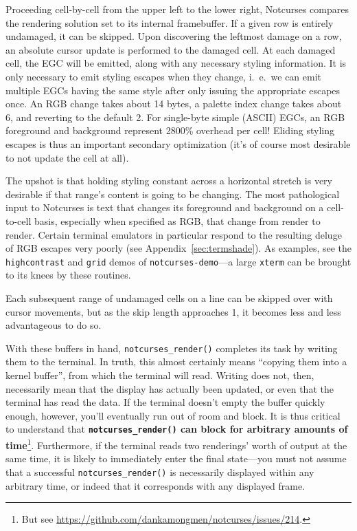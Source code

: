 \documentclass[letterpaper,10pt]{article}
\begin{document}
Proceeding cell-by-cell from the upper left to the lower right, Notcurses
compares the rendering solution set to its internal framebuffer. If a given row
is entirely undamaged, it can be skipped. Upon discovering the leftmost damage
on a row, an absolute cursor update is performed to the damaged cell. At each
damaged cell, the EGC will be emitted, along with any necessary styling
information. It is only necessary to emit styling escapes when they change, i.\ e.\ we
can emit multiple EGCs having the same style after only issuing the appropriate
escapes once. An RGB change takes about 14 bytes, a palette index change
takes about 6, and reverting to the default 2. For single-byte simple (ASCII)
EGCs, an RGB foreground and background represent 2800\% overhead per cell!
Eliding styling escapes is thus an important secondary optimization (it's of
course most desirable to not update the cell at all).

The upshot is that holding styling constant across a horizontal stretch is
very desirable if that range's content is going to be changing. The most
pathological input to Notcurses is text that changes its foreground and background
on a cell-to-cell basis, especially when specified as RGB, that change from
render to render. Certain terminal emulators in particular respond to the
resulting deluge of RGB escapes very poorly (see Appendix~\ref{sec:termshade}).
As examples, see the \texttt{highcontrast} and \texttt{grid} demos of
\texttt{notcurses-demo}---a large \texttt{xterm} can be brought to its knees
by these routines.

Each subsequent range of undamaged cells on a line can be skipped over with
cursor movements, but as the skip length approaches 1, it becomes less and
less advantageous to do so.

With these buffers in hand, \texttt{notcurses\_render()} completes its task by
writing them to the terminal. In truth, this almost certainly means ``copying
them into a kernel buffer'', from which the terminal will read. Writing does not,
then, necessarily mean that the display has actually been updated, or even
that the terminal has read the data. If the terminal doesn't empty the buffer
quickly enough, however, you'll eventually run out of room and block. It is
thus critical to understand that \textbf{\texttt{notcurses\_render()} can block
for arbitrary amounts of time}\footnote{But see
\url{https://github.com/dankamongmen/notcurses/issues/214}.}. Furthermore,
if the terminal reads two renderings' worth of output at the same time, it is
likely to immediately enter the final state---you must not assume that a successful
\texttt{notcurses\_render()} is necessarily displayed within any arbitrary time,
or indeed that it corresponds with any displayed frame.
\end{document}
